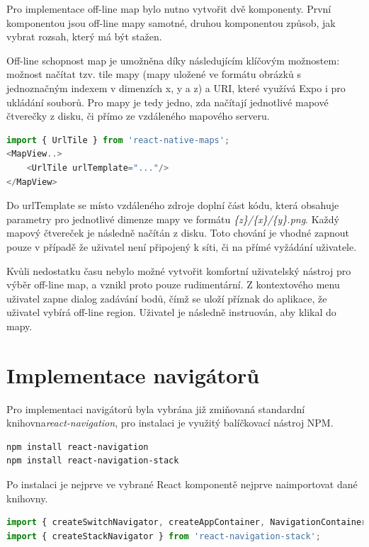 Pro implementace off-line map bylo nutno vytvořit dvě komponenty. První komponentou jsou off-line mapy samotné, druhou komponentou způsob, jak vybrat rozsah, který má být stažen.

Off-line schopnost map je umožněna díky následujícím klíčovým možnostem: možnost načítat tzv. tile mapy (mapy uložené ve formátu obrázků s jednoznačným indexem v dimenzích x, y a z) a URI, které využívá Expo i pro ukládání souborů. Pro mapy je tedy jedno, zda načítají jednotlivé mapové čtverečky z disku, či přímo ze vzdáleného mapového serveru.

\begin{lstlisting}[language=JavaScript, caption=Off-line mapy]
import { UrlTile } from 'react-native-maps';
<MapView..>
	<UrlTile urlTemplate="..."/>
</MapView>
\end{lstlisting}

Do urlTemplate se místo vzdáleného zdroje doplní část kódu, která obsahuje parametry pro jednotlivé dimenze mapy ve formátu \emph{\{z\}/\{x\}/\{y\}.png}. Každý mapový čtvereček je následně načítán z disku. Toto chování je vhodné zapnout pouze v případě že uživatel není připojený k síti, či na přímé vyžádání uživatele.

Kvůli nedostatku času nebylo možné vytvořit komfortní uživatelský nástroj pro výběr off-line map, a vznikl proto pouze rudimentární. Z kontextového menu uživatel zapne dialog zadávání bodů, čímž se uloží příznak do aplikace, že uživatel vybírá off-line region. Uživatel je následně instruován, aby klikal do mapy.

\section{Implementace navigátorů}

Pro implementaci navigátorů byla vybrána již zmiňovaná standardní knihovna\linebreak \emph{react-navigation}, pro instalaci je využitý balíčkovací nástroj NPM.

\begin{lstlisting}[language=Bash, caption=Instalace react-navigation]
npm install react-navigation
npm install react-navigation-stack
\end{lstlisting}

Po instalaci je nejprve ve vybrané React komponentě nejprve naimportovat dané knihovny. 

\begin{lstlisting}[language=JavaScript, caption=Import knihoven pro hlavní navigátor]
import { createSwitchNavigator, createAppContainer, NavigationContainerComponent, NavigationActions } from 'react-navigation';
import { createStackNavigator } from 'react-navigation-stack';
\end{lstlisting}

